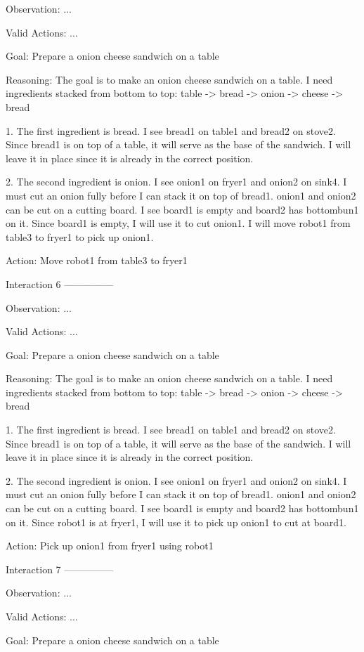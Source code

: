 Observation:
...

Valid Actions:
...

Goal: Prepare a onion cheese sandwich on a table


Reasoning: The goal is to make an onion cheese sandwich on a table. I need ingredients stacked from bottom to top: table -> bread -> onion -> cheese -> bread

1. The first ingredient is bread. I see bread1 on table1 and bread2 on stove2. Since bread1 is on top of a table, it will serve as the base of the sandwich. I will leave it in place since it is already in the correct position.

2. The second ingredient is onion. I see onion1 on fryer1 and onion2 on sink4. I must cut an onion fully before I can stack it on top of bread1. onion1 and onion2 can be cut on a cutting board. I see board1 is empty and board2 has bottombun1 on it. Since board1 is empty, I will use it to cut onion1. I will move robot1 from table3 to fryer1 to pick up onion1.

Action: Move robot1 from table3 to fryer1


Interaction 6
---------------


Observation:
...

Valid Actions:
...

Goal: Prepare a onion cheese sandwich on a table


Reasoning: The goal is to make an onion cheese sandwich on a table. I need ingredients stacked from bottom to top: table -> bread -> onion -> cheese -> bread

1. The first ingredient is bread. I see bread1 on table1 and bread2 on stove2. Since bread1 is on top of a table, it will serve as the base of the sandwich. I will leave it in place since it is already in the correct position.

2. The second ingredient is onion. I see onion1 on fryer1 and onion2 on sink4. I must cut an onion fully before I can stack it on top of bread1. onion1 and onion2 can be cut on a cutting board. I see board1 is empty and board2 has bottombun1 on it. Since robot1 is at fryer1, I will use it to pick up onion1 to cut at board1.

Action: Pick up onion1 from fryer1 using robot1


Interaction 7
---------------


Observation:
...

Valid Actions:
...

Goal: Prepare a onion cheese sandwich on a table


